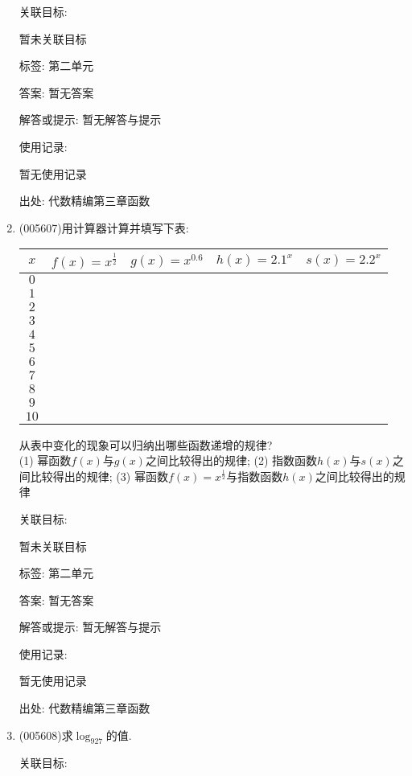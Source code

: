 \documentclass[10pt,a4paper]{article}
\begin{document}
\begin{enumerate}[1.]
关联目标:

暂未关联目标



标签: 第二单元

答案: 暂无答案

解答或提示: 暂无解答与提示

使用记录:

暂无使用记录


出处: 代数精编第三章函数
\item { (005607)}用计算器计算并填写下表:
\begin{center}
    \begin{tabular}{|c|c|c|c|c|}
        \hline
        $x$	& $f(x)=x^{\frac 12}$ & $g(x)=x^{0.6}$ & $h(x)=2.1^x$ & $s(x)=2.2^x$ \\ \hline
        $0$ & & & & \\ \hline
        $1$ & & & & \\ \hline
        $2$ & & & & \\ \hline
        $3$ & & & & \\ \hline
        $4$ & & & & \\ \hline
        $5$ & & & & \\ \hline
        $6$ & & & & \\ \hline
        $7$ & & & & \\ \hline
        $8$ & & & & \\ \hline
        $9$ & & & & \\ \hline
        $10$ & & & & \\ \hline
    \end{tabular}
\end{center}
从表中变化的现象可以归纳出哪些函数递增的规律?\\
(1) 幂函数$f(x)$与$g(x)$之间比较得出的规律;
(2) 指数函数$h(x)$与$s(x)$之间比较得出的规律;
(3) 幂函数$f(x)=x^{\frac 12}$与指数函数$h(x)$之间比较得出的规律


关联目标:

暂未关联目标



标签: 第二单元

答案: 暂无答案

解答或提示: 暂无解答与提示

使用记录:

暂无使用记录


出处: 代数精编第三章函数
\item { (005608)}求$\log_927$的值.


关联目标:


\end{enumerate}
\end{document}
